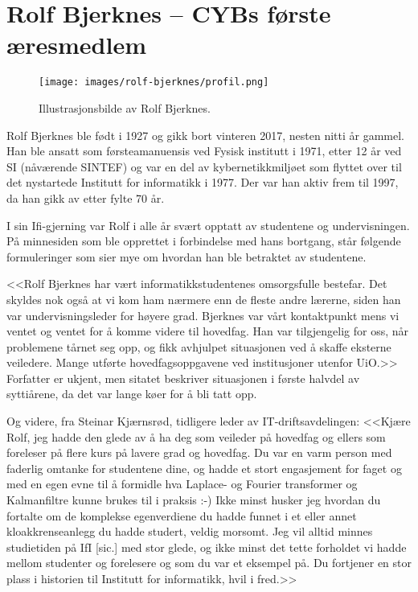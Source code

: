 \chapter[Rolf Bjerknes]{Rolf Bjerknes -- CYBs første æresmedlem}

\author{Skrevet av Narve Trædal}

\begin{wrapfigure}{r}{6cm}
	\centering
	\texttt{[image: images/rolf-bjerknes/profil.png]}
	\label{fig:rolf-bjerknes}
	\caption{Illustrasjonsbilde av Rolf Bjerknes.}
\end{wrapfigure}

Rolf Bjerknes ble født i 1927 og gikk bort vinteren 2017, nesten nitti år gammel. Han ble ansatt som førsteamanuensis ved Fysisk institutt i 1971, etter 12 år ved SI (nåværende SINTEF) og var en del av kybernetikkmiljøet som flyttet over til det nystartede Institutt for informatikk i 1977. Der var han
aktiv frem til 1997, da han gikk av etter fylte 70 år.

I sin Ifi-gjerning var Rolf i alle år svært opptatt av studentene og undervisningen. På minnesiden som ble opprettet i forbindelse med hans bortgang, står følgende formuleringer som sier mye om hvordan han ble betraktet av studentene.

<<Rolf Bjerknes har vært informatikkstudentenes omsorgsfulle bestefar. Det skyldes nok også at vi kom ham nærmere enn de fleste andre lærerne, siden han var undervisningsleder for høyere grad. Bjerknes var vårt kontaktpunkt mens vi ventet og ventet for å komme videre til hovedfag. Han var tilgjengelig for oss, når problemene tårnet seg opp, og fikk avhjulpet situasjonen ved å skaffe eksterne veiledere. Mange utførte hovedfagsoppgavene ved institusjoner utenfor UiO.>> Forfatter er ukjent, men sitatet beskriver situasjonen i første halvdel av syttiårene, da det var lange køer for å bli tatt opp.

Og videre, fra Steinar Kjærnsrød, tidligere leder av IT-driftsavdelingen: <<Kjære Rolf, jeg hadde den glede av å ha deg som veileder på hovedfag og ellers som foreleser på flere kurs på lavere grad og hovedfag. Du var en varm person med faderlig omtanke for studentene dine, og hadde et stort engasjement for faget og med en egen evne til å formidle hva Laplace- og Fourier transformer og Kalmanfiltre kunne brukes til i praksis :-) Ikke minst husker jeg hvordan du fortalte om de komplekse egenverdiene du hadde funnet i et eller annet kloakkrenseanlegg du hadde studert, veldig morsomt. Jeg vil alltid minnes studietiden på IfI [sic.] med stor glede, og ikke minst det tette forholdet vi hadde mellom studenter og forelesere og som du var et eksempel på. Du fortjener en stor plass i historien til Institutt for informatikk, hvil i fred.>>

